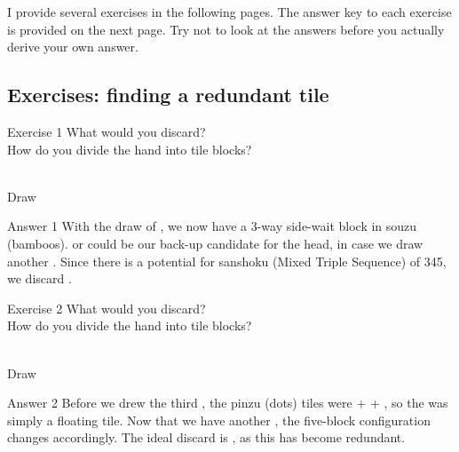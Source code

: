 \bigskip
I provide several exercises in the following pages. The answer key to each exercise is provided on the next page. Try not to look at the answers before you actually derive your own answer. 

\vfill

\subsection*{Exercises: finding a redundant tile}

\bigskip

\begin{itembox}[l]{Exercise 1}
What would you discard? \\
\vsp
How do you divide the hand into tile blocks? 

\bp
{}~\\
\hfill\footnotesize{Draw~~~~~~~~~~~}
\ep
\end{itembox}

\newpage

\begin{itembox}[r]{Answer 1}
\emj
With the draw of {\LARGE{}}, we now have a 3-way side-wait block in {\jap souzu} (bamboos). {\LARGE{}} or {\LARGE{}} could be our back-up candidate for the head, in case we draw another {\LARGE{}}. Since there is a potential for {\jap sanshoku} (Mixed Triple Sequence) of 345, we discard {\LARGE{}}. 
\end{itembox}

\vfill

\begin{itembox}[l]{Exercise 2}
What would you discard? \\
\vsp
How do you divide the hand into tile blocks? 

\bp
{}~\\
\hfill\footnotesize{Draw~~~~~~~~~~~}
\ep
\end{itembox}

\newpage


\bigskip
\begin{itembox}[r]{Answer 2}
\emj
Before we drew the third {\LARGE{}}, the {\jap pinzu} (dots) tiles were {\LARGE{} +  + }, so the {\LARGE{}} was simply a floating tile. Now that we have another {\LARGE{}}, the five-block configuration changes accordingly. The ideal discard is {\LARGE{}}, as this has become redundant.
\end{itembox}

